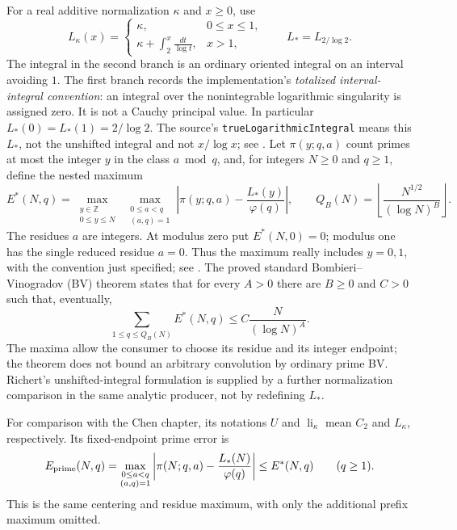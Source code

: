 For a real additive normalization $\kappa$ and $x\ge0$, use
\[
 L_\kappa(x)=
 \begin{cases}
 \kappa,&0\le x\le1,\\
 \displaystyle\kappa+\int_2^x\frac{dt}{\log t},&x>1,
 \end{cases}
 \qquad L_*=L_{2/\log2}.
\]
The integral in the second branch is an ordinary oriented integral on an
interval avoiding $1$. The first branch records the implementation's
\emph{totalized interval-integral convention}: an integral over the
nonintegrable logarithmic singularity is assigned zero. It is not a Cauchy
principal value. In particular $L_*(0)=L_*(1)=2/\log2$.
The source's \texttt{trueLogarithmicIntegral} means this $L_*$, not the
unshifted integral and not $x/\log x$; see
.
Let $\pi(y;q,a)$ count primes at most the integer $y$ in the class $a\bmod q$,
and, for integers $N\ge0$ and $q\ge1$, define the nested maximum
\[
 E^*(N,q)=\max_{\substack{y\in\mathbb Z\\0\le y\le N}}\ \max_{\substack{0\le a<q\\(a,q)=1}}
 \left|\pi(y;q,a)-\frac{L_*(y)}{\varphi(q)}\right|,
 \qquad Q_B(N)=\left\lfloor\frac{N^{1/2}}{(\log N)^B}\right\rfloor.
\]
The residues $a$ are integers. At modulus zero put $E^*(N,0)=0$;
modulus one has the single reduced residue $a=0$.
Thus the maximum really includes $y=0,1$, with the convention just specified;
see .
The proved standard Bombieri--Vinogradov (BV) theorem states that for every $A>0$
there are $B\ge0$ and $C>0$ such that, eventually,
\[
 \sum_{1\le q\le Q_B(N)} E^*(N,q)\le C\frac{N}{(\log N)^A}.
\]
The maxima allow the consumer to choose its residue and its integer endpoint;
the theorem does not bound an arbitrary convolution by ordinary prime BV.
Richert's unshifted-integral formulation is supplied by a further normalization
comparison in the same analytic producer, not by redefining $L_*$.

For comparison with the Chen chapter, its notations $U$ and
$\operatorname{li}_\kappa$ mean $C_2$ and $L_\kappa$, respectively.
Its fixed-endpoint prime error is
\[
 E_{\rm prime}(N,q)=\max_{\substack{0\le a<q\\(a,q)=1}}
 \left|\pi(N;q,a)-\frac{L_*(N)}{\varphi(q)}\right|
 \le E^*(N,q) \qquad(q\ge1).
\]
This is the same centering and residue maximum, with only the additional
prefix maximum omitted.

